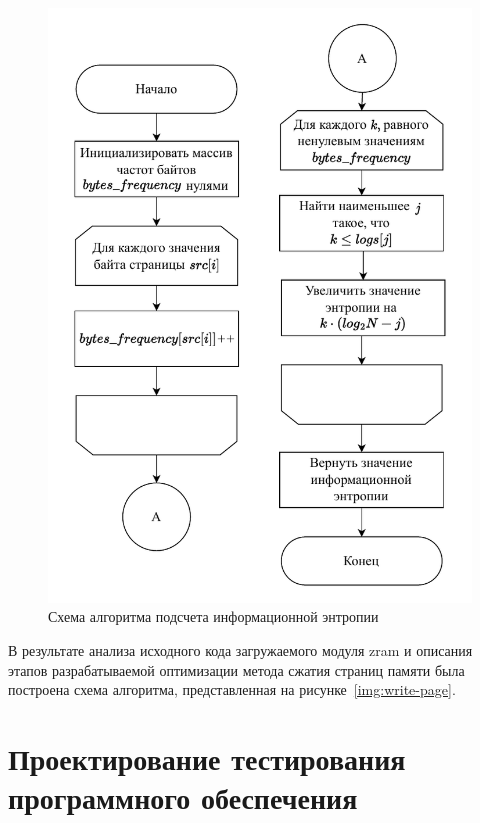 \begin{figure}[H]
	\begin{center}
		\includegraphics[scale=0.7]{inc/img/get-entropy.pdf}
	\end{center}
	\captionsetup{justification=centering}
	\caption{Схема алгоритма подсчета информационной энтропии}
	\label{img:get-entropy}
\end{figure}

В результате анализа исходного кода загружаемого модуля zram \cite{zram-code} и описания этапов разрабатываемой оптимизации метода сжатия страниц памяти была построена схема алгоритма, представленная на рисунке~\ref{img:write-page}.

\section{Проектирование тестирования программного обеспечения}

